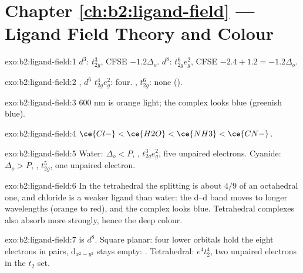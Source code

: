 \section*{Chapter \ref{ch:b2:ligand-field} --- Ligand Field Theory and Colour}

\begin{solution}{exo:b2:ligand-field:1}
$d^3$: $t_{2g}^3$, CFSE $-1.2\Delta_o$. $d^8$: $t_{2g}^6e_g^2$, CFSE $-2.4 + 1.2 = -1.2\Delta_o$.
\end{solution}

\begin{solution}{exo:b2:ligand-field:2}
, $d^6$  $t_{2g}^4e_g^2$: four. , 
$t_{2g}^6$: none ().
\end{solution}

\begin{solution}{exo:b2:ligand-field:3}
600 nm is orange light; the complex looks blue (greenish blue).
\end{solution}

\begin{solution}{exo:b2:ligand-field:4}
$\ce{Cl-} < \ce{H2O} < \ce{NH3} < \ce{CN-}$.
\end{solution}

\begin{solution}{exo:b2:ligand-field:5}
Water: $\Delta_o < P$, , $t_{2g}^3e_g^2$, five unpaired electrons. Cyanide: $\Delta_o > P$,
, $t_{2g}^5$, one unpaired electron.
\end{solution}

\begin{solution}{exo:b2:ligand-field:6}
In the tetrahedral  the splitting is about $4/9$ of an octahedral one, and
chloride is a weaker ligand than water: the d--d band moves to longer wavelengths (orange
to red), and the complex looks blue. Tetrahedral complexes also absorb more strongly,
hence the deep colour.
\end{solution}

\begin{solution}{exo:b2:ligand-field:7}
 is $d^8$. Square planar: four lower orbitals hold the eight electrons in pairs,
$\mathrm d_{x^2-y^2}$ stays empty: . Tetrahedral: $e^4t_2^4$, two unpaired electrons
in the $t_2$ set.
\end{solution}

